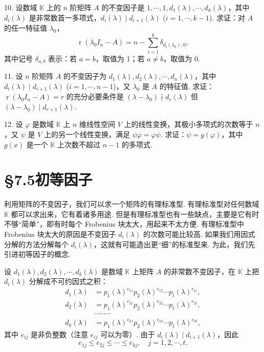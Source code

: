 \documentclass[UTF8,12pt,a4paper,fontset=fandol]{ctexart}
\begin{document}
10. 设数域 $\mathbb{K}$ 上的 $n$ 阶矩阵 $A$ 的不变因子是 $1,\cdots,1,d_1(\lambda),\cdots,d_k(\lambda)$，其中 $d_i(\lambda)$ 是非常数首一多项式，$d_i(\lambda)\mid d_{i+1}(\lambda)$ ($i=1,\cdots,k-1$). 求证：对 $A$ 的任一特征值 $\lambda_0$，
\[
\operatorname{r}(\lambda_0I_n-A)=n-\sum_{i=1}^k\delta_{d_i(\lambda_0),0},
\]
其中记号 $\delta_{a,b}$ 表示：若 $a=b$，取值为 1；若 $a\neq b$，取值为 0.

11. 设 $n$ 阶矩阵 $A$ 的不变因子为 $d_1(\lambda),d_2(\lambda),\cdots,d_n(\lambda)$，其中 $d_i(\lambda)\mid d_{i+1}(\lambda)$ ($i=1,\cdots,n-1$)，又 $\lambda_0$ 是 $A$ 的特征值. 求证：$\operatorname{r}(\lambda_0I_n-A)=r$ 的充分必要条件是 $(\lambda-\lambda_0)\nmid d_r(\lambda)$ 但 $(\lambda-\lambda_0)\mid d_{r+1}(\lambda)$.

12. 设 $\varphi$ 是数域 $\mathbb{K}$ 上 $n$ 维线性空间 $V$ 上的线性变换，其极小多项式的次数等于 $n$，又 $\psi$ 是 $V$ 上的另一个线性变换，满足 $\psi\varphi=\varphi\psi$. 求证：$\psi=g(\varphi)$，其中 $g(x)$ 是一个 $\mathbb{K}$ 上次数不超过 $n-1$ 的多项式.

\section*{§7.5\quad 初等因子}

利用矩阵的不变因子，我们可以求一个矩阵的有理标准型. 有理标准型对任何数域 $\mathbb{K}$ 都可以求出来，它有着诸多用途. 但是有理标准型也有一些缺点，主要是它有时不够“简单”，即有时每个 Frobenius 块太大，用起来不太方便. 有理标准型中 Frobenius 块太大的原因是不变因子 $d_i(\lambda)$ 的次数可能比较高. 如果我们用因式分解的方法分解每个 $d_i(\lambda)$，这就有可能造出更“细”的标准型来. 为此，我们先引进初等因子的概念.

设 $d_1(\lambda),d_2(\lambda),\cdots,d_k(\lambda)$ 是数域 $\mathbb{K}$ 上矩阵 $A$ 的非常数不变因子，在 $\mathbb{K}$ 上把 $d_i(\lambda)$ 分解成不可约因式之积：
\begin{equation}
\begin{aligned}
d_1(\lambda)&=p_1(\lambda)^{e_{11}}p_2(\lambda)^{e_{12}}\cdots p_t(\lambda)^{e_{1t}},\\
d_2(\lambda)&=p_1(\lambda)^{e_{21}}p_2(\lambda)^{e_{22}}\cdots p_t(\lambda)^{e_{2t}},\\
&\cdots\cdots\cdots\\
d_k(\lambda)&=p_1(\lambda)^{e_{k1}}p_2(\lambda)^{e_{k2}}\cdots p_t(\lambda)^{e_{kt}},
\end{aligned}
\tag{7.5.1}
\end{equation}
其中 $e_{ij}$ 是非负整数（注意 $e_{ij}$ 可以为零）. 由于 $d_i(\lambda)\mid d_{i+1}(\lambda)$，因此
\[
e_{1j}\leq e_{2j}\leq\cdots\leq e_{kj},\quad j=1,2,\cdots,t.
\]
\end{document}
